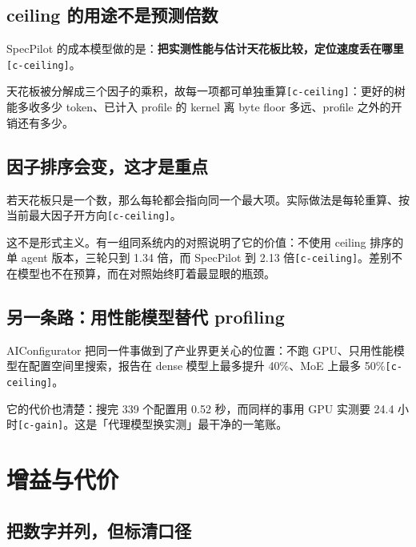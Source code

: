 \subsection{ceiling 的用途不是预测倍数}

SpecPilot 的成本模型做的是：\textbf{把实测性能与估计天花板比较，定位速度丢在哪里}{\scriptsize\texttt{[c-\hspace{0pt}ceiling]}}。


天花板被分解成三个因子的乘积，故每一项都可单独重算{\scriptsize\texttt{[c-\hspace{0pt}ceiling]}}：更好的树能多收多少 token、已计入 profile 的 kernel 离 byte floor 多远、profile 之外的开销还有多少。


\subsection{因子排序会变，这才是重点}

若天花板只是一个数，那么每轮都会指向同一个最大项。实际做法是每轮重算、按当前最大因子开方向{\scriptsize\texttt{[c-\hspace{0pt}ceiling]}}。


这不是形式主义。有一组同系统内的对照说明了它的价值：不使用 ceiling 排序的单 agent 版本，三轮只到 1.34 倍，而 SpecPilot 到 2.13 倍{\scriptsize\texttt{[c-\hspace{0pt}ceiling]}}。差别不在模型也不在预算，而在对照始终盯着最显眼的瓶颈。


\subsection{另一条路：用性能模型替代 profiling}

AIConfigurator 把同一件事做到了产业界更关心的位置：不跑 GPU、只用性能模型在配置空间里搜索，报告在 dense 模型上最多提升 40\%、MoE 上最多 50\%{\scriptsize\texttt{[c-\hspace{0pt}ceiling]}}。


它的代价也清楚：搜完 339 个配置用 0.52 秒，而同样的事用 GPU 实测要 24.4 小时{\scriptsize\texttt{[c-\hspace{0pt}gain]}}。这是「代理模型换实测」最干净的一笔账。


\section{增益与代价}

\subsection{把数字并列，但标清口径}

